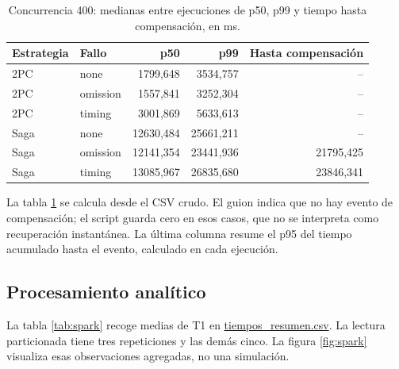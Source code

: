 \documentclass[12pt,a4paper]{article}
\newcommand{\evidencia}[2]{\href{https://github.com/JoseLozanoMorales/TiendaTech/blob/c5dca588ea9662cab56732c97fe644b9a929854b/#1}{#2}}
\begin{document}
\begin{table}[H]\centering\small
\caption{Concurrencia 400: medianas entre ejecuciones de p50, p99 y tiempo hasta compensación, en ms.}\label{tab:colas}
\begin{tabular}{llrrr}
\toprule Estrategia & Fallo & p50 & p99 & Hasta compensación\\\midrule
2PC & none & 1799,648 & 3534,757 & --\\
2PC & omission & 1557,841 & 3252,304 & --\\
2PC & timing & 3001,869 & 5633,613 & --\\
Saga & none & 12630,484 & 25661,211 & --\\
Saga & omission & 12141,354 & 23441,936 & 21795,425\\
Saga & timing & 13085,967 & 26835,680 & 23846,341\\\bottomrule
\end{tabular}
\end{table}
La tabla \ref{tab:colas} se calcula desde el CSV crudo. El guion indica que no hay evento de compensación; el script guarda cero en esos casos, que no se interpreta como recuperación instantánea. La última columna resume el p95 del tiempo acumulado hasta el evento, calculado en cada ejecución.

\subsection{Procesamiento analítico}
La tabla \ref{tab:spark} recoge medias de T1 en \evidencia{resultados/tiempos_resumen.csv}{tiempos\_resumen.csv}. La lectura particionada tiene tres repeticiones y las demás cinco. La figura \ref{fig:spark} visualiza esas observaciones agregadas, no una simulación.
\end{document}
